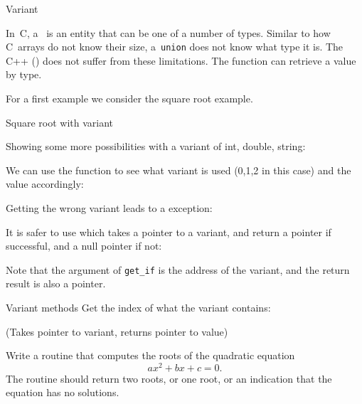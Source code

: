  {Variant}
\label{sec:stl-variant}

In~C, a~ is an entity that can be one of a number of types.
Similar to how C~arrays do not know their size,
a~\lstinline{union} does not know what type it is.
The C++  ()
does not suffer from these limitations.
The function  can retrieve a value by type.

For a first example we consider the square root example.

\begin{block}{Square root with variant}
  \label{sl:root-variant}
  \begin{multicols}{2}
    \columnbreak
  \end{multicols}
\end{block}

Showing some more possibilities with a variant of int, double, string:

We can use the  function to see what variant is used
(0,1,2 in this case)
and  the value accordingly:

Getting the wrong variant leads to a  exception:

It is safer to use  which
takes a pointer to a variant,
and return a pointer if successful, and a null pointer if not:

Note that the argument of \lstinline{get_if} is the address of the variant,
and the return result is also a pointer.

\begin{slide}{Variant methods}
  \label{sl:cpp-variant}
  Get the index of what the variant contains:
  
  (Takes pointer to variant, returns pointer to value)
\end{slide}

\begin{exercise}
  \label{ex:quad-roots}
  Write a routine that computes the roots of the quadratic equation
  \[ ax^2+bx+c=0. \]
  The routine should return two roots, or one root, or an indication
  that the equation has no solutions.
\end{exercise}

